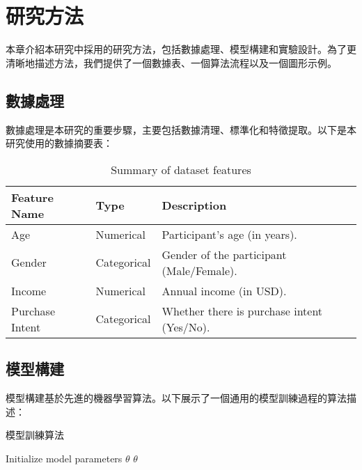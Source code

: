 \chapter{研究方法}
\label{c:methods}
本章介紹本研究中採用的研究方法，包括數據處理、模型構建和實驗設計。為了更清晰地描述方法，我們提供了一個數據表、一個算法流程以及一個圖形示例。

\section{數據處理}

數據處理是本研究的重要步驟，主要包括數據清理、標準化和特徵提取。以下是本研究使用的數據摘要表：

\begin{table}[htbp]
  \centering
  \begin{tabularx}{\textwidth}{@{}lXX@{}}
    \toprule
    \textbf{Feature Name} & \textbf{Type} & \textbf{Description} \\
    \midrule
    Age                   & Numerical      & Participant's age (in years). \\
    Gender                & Categorical    & Gender of the participant (Male/Female). \\
    Income                & Numerical      & Annual income (in USD). \\
    Purchase Intent       & Categorical    & Whether there is purchase intent (Yes/No). \\
    \bottomrule
  \end{tabularx}
  \caption{Summary of dataset features}
  \label{tab:data_summary}
\end{table}

\section{模型構建}

模型構建基於先進的機器學習算法。以下展示了一個通用的模型訓練過程的算法描述：

\begin{algorithm}[htbp]
  \caption{模型訓練算法}
  \label{alg:model_training}

  Initialize model parameters \( \theta \)\;
  \Return \( \theta \;
  \)
\end{algorithm}

